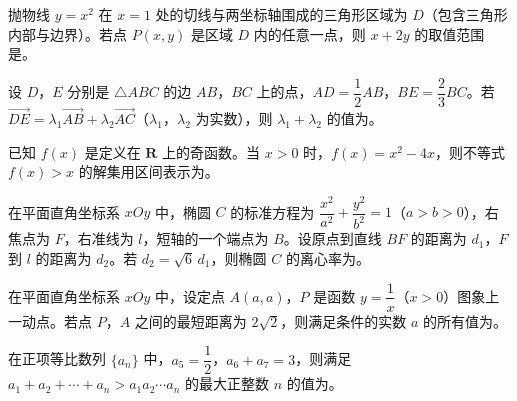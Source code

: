\begin{question}
抛物线 $y=x^2$ 在 $x=1$ 处的切线与两坐标轴围成的三角形区域为 $D$（包含三角形内部与边界）。若点 $P(x,y)$ 是区域 $D$ 内的任意一点，则 $x+2y$ 的取值范围是\gkblank{}。

\end{question}
\begin{question}
设 $D$，$E$ 分别是 $\triangle ABC$ 的边 $AB$，$BC$ 上的点，$AD=\dfrac12AB$，$BE=\dfrac23BC$。若 $\overrightarrow{DE}=\lambda_1\overrightarrow{AB}+\lambda_2\overrightarrow{AC}$（$\lambda_1$，$\lambda_2$ 为实数），则 $\lambda_1+\lambda_2$ 的值为\gkblank{}。

\end{question}
\begin{question}
已知 $f(x)$ 是定义在 $\mathbf R$ 上的奇函数。当 $x>0$ 时，$f(x)=x^2-4x$，则不等式 $f(x)>x$ 的解集用区间表示为\gkblank{}。

\end{question}
\begin{question}
在平面直角坐标系 $xOy$ 中，椭圆 $C$ 的标准方程为 $\dfrac{x^2}{a^2}+\dfrac{y^2}{b^2}=1$（$a>b>0$），右焦点为 $F$，右准线为 $l$，短轴的一个端点为 $B$。设原点到直线 $BF$ 的距离为 $d_1$，$F$ 到 $l$ 的距离为 $d_2$。若 $d_2=\sqrt6\,d_1$，则椭圆 $C$ 的离心率为\gkblank{}。

\end{question}
\begin{question}
在平面直角坐标系 $xOy$ 中，设定点 $A(a,a)$，$P$ 是函数 $y=\dfrac1x$（$x>0$）图象上一动点。若点 $P$，$A$ 之间的最短距离为 $2\sqrt2$，则满足条件的实数 $a$ 的所有值为\gkblank{}。

\end{question}
\begin{question}
在正项等比数列 $\{a_n\}$ 中，$a_5=\dfrac12$，$a_6+a_7=3$，则满足 $a_1+a_2+\cdots+a_n>a_1a_2\cdots a_n$ 的最大正整数 $n$ 的值为\gkblank{}。

\end{question}

